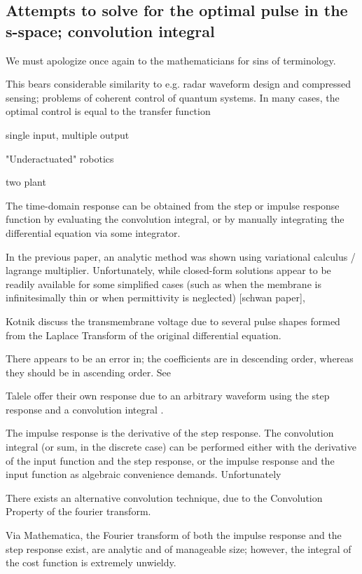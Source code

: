 \documentclass[fleqn,10pt]{paper}
\begin{document}
\subsection{Attempts to solve for the optimal pulse in the s-space; convolution integral}

We must apologize once again to the mathematicians for sins of terminology.

This bears considerable similarity to e.g. radar waveform design and compressed sensing; problems of coherent control of quantum systems. In many cases, the optimal control is equal to the transfer function


single input, multiple output 

"Underactuated" robotics

two plant

The time-domain response can be obtained from the step or impulse response function by evaluating the convolution integral, or by manually integrating the differential equation via some integrator.

In the previous paper, an analytic method was shown using variational calculus / lagrange multiplier. Unfortunately, while closed-form solutions appear to be readily available for some simplified cases (such as when the membrane is infinitesimally thin or when permittivity is neglected) [schwan paper], 

Kotnik discuss the transmembrane voltage due to several pulse shapes formed from the Laplace Transform of the original differential equation. 

There appears to be an error in; the coefficients are in descending order, whereas they should be in ascending order. See 

Talele offer their own response due to an arbitrary waveform using the step response and a convolution integral \cite{Nonlinear2007}.

The impulse response is the derivative of the step response. The convolution integral (or sum, in the discrete case) can be performed either with the derivative of the input function and the step response, or the impulse response and the input function as algebraic convenience demands. Unfortunately

There exists an alternative convolution technique, due to the Convolution Property of the fourier transform.

Via Mathematica, the Fourier transform of both the impulse response and the step response exist, are analytic and of manageable size; however, the integral of the cost function is extremely unwieldy.
\end{document}
